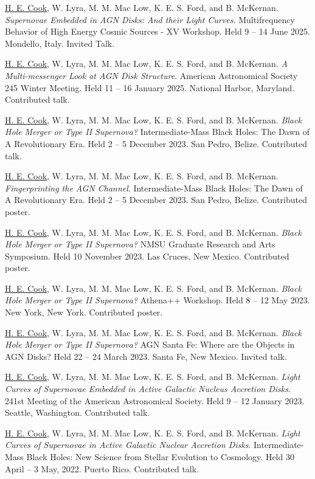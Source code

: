 \hangindent=0.5in \noindent \underline{H. E. Cook}, W. Lyra, M. M. Mac Low, K. E. S. Ford, and B. McKernan. \textit{Supernovae Embedded in AGN Disks: And their Light Curves}. Multifrequency Behavior of High Energy Cosmic Sources - XV Workshop. Held 9 -- 14 June 2025. Mondello, Italy. Invited Talk.

\hangindent=0.5in \noindent \underline{H. E. Cook}, W. Lyra, M. M. Mac Low, K. E. S. Ford, and B. McKernan. \textit{A Multi-messenger Look at AGN Disk Structure}. American Astronomical Society 245 Winter Meeting. Held 11 -- 16 January 2025. National Harbor, Maryland. Contributed talk.

\hangindent=0.5in \noindent \underline{H. E. Cook}, W. Lyra, M. M. Mac Low, K. E. S. Ford, and B. McKernan. \textit{Black Hole Merger or Type II Supernova?} Intermediate-Mass Black Holes: The Dawn of A Revolutionary Era. Held 2 -- 5 December 2023. San Pedro, Belize. Contributed talk.

\hangindent=0.5in \noindent \underline{H. E. Cook}, W. Lyra, M. M. Mac Low, K. E. S. Ford, and B. McKernan. \textit{Fingerprinting the AGN Channel}. Intermediate-Mass Black Holes: The Dawn of A Revolutionary Era. Held 2 -- 5 December 2023. San Pedro, Belize. Contributed poster.

\hangindent=0.5in \noindent \underline{H. E. Cook}, W. Lyra, M. M. Mac Low, K. E. S. Ford, and B. McKernan. \textit{Black Hole Merger or Type II Supernova?} NMSU Graduate Research and Arts Symposium. Held 10 November 2023. Las Cruces, New Mexico. Contributed poster.

\hangindent=0.5in \noindent \underline{H. E. Cook}, W. Lyra, M. M. Mac Low, K. E. S. Ford, and B. McKernan. \textit{Black Hole Merger or Type II  Supernova?} Athena++ Workshop. Held 8 -- 12 May 2023. New York, New York. Contributed poster.

\hangindent=0.5in \noindent \underline{H. E. Cook}, W. Lyra, M. M. Mac Low, K. E. S. Ford, and B. McKernan. \textit{Black Hole Merger or Type II  Supernova?} AGN Santa Fe: Where are the Objects in AGN Disks? Held 22 -- 24 March 2023. Santa Fe, New Mexico. Invited talk.

\hangindent=0.5in \noindent \underline{H. E. Cook}, W. Lyra, M. M. Mac Low, K. E. S. Ford, and B. McKernan. \textit{Light Curves of Supernovae Embedded in Active Galactic Nucleus Accretion Disks}. 241st Meeting of the American Astronomical Society. Held 9 -- 12 January 2023. Seattle, Washington. Contributed talk.

\hangindent=0.5in \noindent \underline{H. E. Cook}, W. Lyra, M. M. Mac Low, K. E. S. Ford, and B. McKernan. \textit{Light Curves of Supernovae in Active Galactic Nuclear Accretion Disks}. Intermediate-Mass Black Holes: New Science from Stellar Evolution to Cosmology. Held 30 April -- 3 May, 2022. Puerto Rico. Contributed talk.

